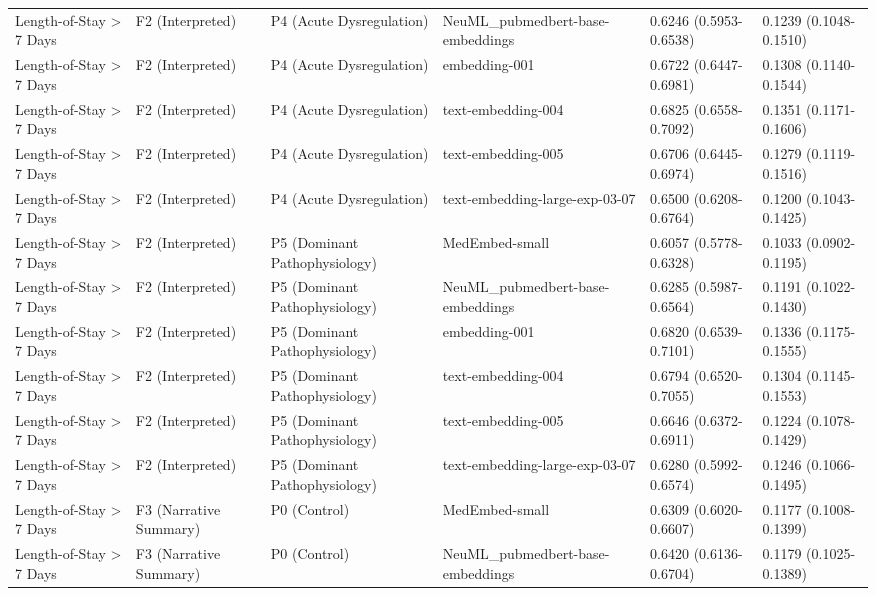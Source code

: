 \documentclass[border=0pt]{standalone}
\begin{document}
\begin{adjustbox}{width=\textwidth}
\begin{tabular}{llllll}
Length-of-Stay \textgreater{} 7 Days & F2 (Interpreted) & P4 (Acute Dysregulation) & NeuML\_pubmedbert-base-embeddings & 0.6246 (0.5953-0.6538) & 0.1239 (0.1048-0.1510) \\
Length-of-Stay \textgreater{} 7 Days & F2 (Interpreted) & P4 (Acute Dysregulation) & embedding-001 & 0.6722 (0.6447-0.6981) & 0.1308 (0.1140-0.1544) \\
Length-of-Stay \textgreater{} 7 Days & F2 (Interpreted) & P4 (Acute Dysregulation) & text-embedding-004 & 0.6825 (0.6558-0.7092) & 0.1351 (0.1171-0.1606) \\
Length-of-Stay \textgreater{} 7 Days & F2 (Interpreted) & P4 (Acute Dysregulation) & text-embedding-005 & 0.6706 (0.6445-0.6974) & 0.1279 (0.1119-0.1516) \\
Length-of-Stay \textgreater{} 7 Days & F2 (Interpreted) & P4 (Acute Dysregulation) & text-embedding-large-exp-03-07 & 0.6500 (0.6208-0.6764) & 0.1200 (0.1043-0.1425) \\
Length-of-Stay \textgreater{} 7 Days & F2 (Interpreted) & P5 (Dominant Pathophysiology) & MedEmbed-small & 0.6057 (0.5778-0.6328) & 0.1033 (0.0902-0.1195) \\
Length-of-Stay \textgreater{} 7 Days & F2 (Interpreted) & P5 (Dominant Pathophysiology) & NeuML\_pubmedbert-base-embeddings & 0.6285 (0.5987-0.6564) & 0.1191 (0.1022-0.1430) \\
Length-of-Stay \textgreater{} 7 Days & F2 (Interpreted) & P5 (Dominant Pathophysiology) & embedding-001 & 0.6820 (0.6539-0.7101) & 0.1336 (0.1175-0.1555) \\
Length-of-Stay \textgreater{} 7 Days & F2 (Interpreted) & P5 (Dominant Pathophysiology) & text-embedding-004 & 0.6794 (0.6520-0.7055) & 0.1304 (0.1145-0.1553) \\
Length-of-Stay \textgreater{} 7 Days & F2 (Interpreted) & P5 (Dominant Pathophysiology) & text-embedding-005 & 0.6646 (0.6372-0.6911) & 0.1224 (0.1078-0.1429) \\
Length-of-Stay \textgreater{} 7 Days & F2 (Interpreted) & P5 (Dominant Pathophysiology) & text-embedding-large-exp-03-07 & 0.6280 (0.5992-0.6574) & 0.1246 (0.1066-0.1495) \\
Length-of-Stay \textgreater{} 7 Days & F3 (Narrative Summary) & P0 (Control) & MedEmbed-small & 0.6309 (0.6020-0.6607) & 0.1177 (0.1008-0.1399) \\
Length-of-Stay \textgreater{} 7 Days & F3 (Narrative Summary) & P0 (Control) & NeuML\_pubmedbert-base-embeddings & 0.6420 (0.6136-0.6704) & 0.1179 (0.1025-0.1389) \\

\end{tabular}
\end{adjustbox}
\end{document}
